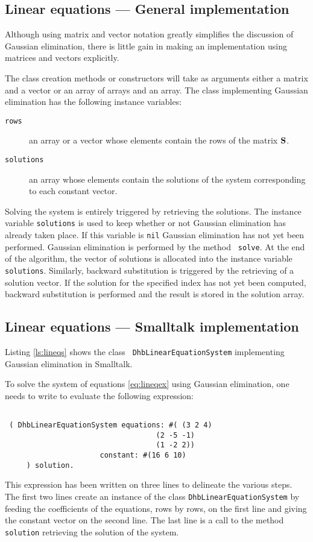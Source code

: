 \documentclass[twoside]{book}
\begin{document}
\subsection{Linear equations --- General implementation}
 Although using matrix and vector
notation greatly simplifies the discussion of Gaussian
elimination, there is little gain in making an implementation
using matrices and vectors explicitly.

The class creation methods or constructors will take as arguments
either a matrix and a vector or an array of arrays and an array.
The class implementing Gaussian elimination has the following
instance variables:
\begin{description}
  \item[\tt rows] an array or a vector whose elements contain the rows of the
  matrix ${\bf S}$.
  \item[\tt solutions] an array whose elements contain the solutions of the
  system corresponding to each constant vector.
\end{description}

Solving the system is entirely triggered by retrieving the
solutions. The instance variable {\tt solutions} is used to keep
whether or not Gaussian elimination has already taken place. If
this variable is {\tt nil} Gaussian elimination has not yet been
performed. Gaussian elimination is performed by the method {\tt
solve}. At the end of the algorithm, the vector of solutions is
allocated into the instance variable {\tt solutions}. Similarly,
backward substitution is triggered by the retrieving of a solution
vector. If the solution for the specified index has not yet been
computed, backward substitution is performed and the result is
stored in the solution array.

\subsection{Linear equations --- Smalltalk implementation}
Listing \ref{ls:lineqs} shows the class {\tt
DhbLinearEquationSystem} implementing Gaussian elimination in
Smalltalk.

To solve the system of equations \ref{eq:lineqex} using Gaussian
elimination, one needs to write to evaluate the following
expression:
\begin{codeExample}
\begin{verbatim}

 ( DhbLinearEquationSystem equations: #( (3 2 4)
                                   (2 -5 -1)
                                   (1 -2 2))
                      constant: #(16 6 10)
     ) solution.
\end{verbatim}
\end{codeExample}
This expression has been written on three lines to delineate the
various steps. The first two lines create an instance of the class
{\tt DhbLinearEquationSystem} by feeding the coefficients of the
equations, rows by rows, on the first line and giving the constant
vector on the second line. The last line is a call to the method
{\tt solution} retrieving the solution of the system.
\end{document}
